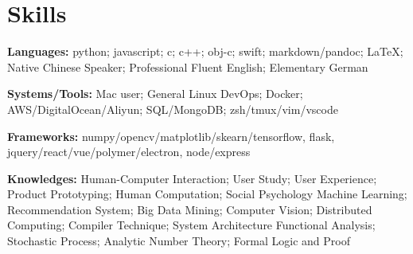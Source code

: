 \section{\textbf{Skills}}
\resumeSubHeadingListStart
\item{
  \textbf{Languages:}{ python; javascript; c; c++; obj-c; swift; markdown/pandoc; \LaTeX; Native Chinese Speaker; Professional Fluent English; Elementary German}
}
\item{
 \textbf{Systems/Tools:}{ Mac user; General Linux DevOps; Docker; AWS/DigitalOcean/Aliyun; SQL/MongoDB; zsh/tmux/vim/vscode}
}
\item{
 \textbf{Frameworks:}{ numpy/opencv/matplotlib/skearn/tensorflow, flask, jquery/react/vue/polymer/electron, node/express}
}
\item{
  \textbf{Knowledges:}{ 
    \resumeItemListStart
       { Human-Computer Interaction; User Study; User Experience; Product Prototyping; Human Computation; Social Psychology}
       { Machine Learning; Recommendation System; Big Data Mining; Computer Vision; Distributed Computing; Compiler Technique; System Architecture}
       { Functional Analysis; Stochastic Process; Analytic Number Theory; Formal Logic and Proof}
   \resumeItemListEnd
  }
}
\resumeSubHeadingListEnd